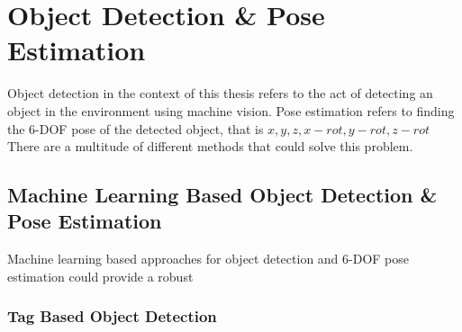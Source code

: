\section{Object Detection \& Pose Estimation}\label{sec:T:ObjectDetection}
Object detection in the context of this thesis refers to the act of detecting an object in the environment using machine vision. Pose estimation refers to finding the 6-DOF pose of the detected object, that is $x,y,z,x-rot, y-rot, z-rot$ There are a multitude of different methods that could solve this problem. 

\subsection{Machine Learning Based Object Detection \& Pose Estimation}
Machine learning based approaches for object detection and 6-DOF pose estimation could provide a robust

\subsubsection{Tag Based Object Detection }\label{sec:T:OD:TagBasedObjectDetection}





